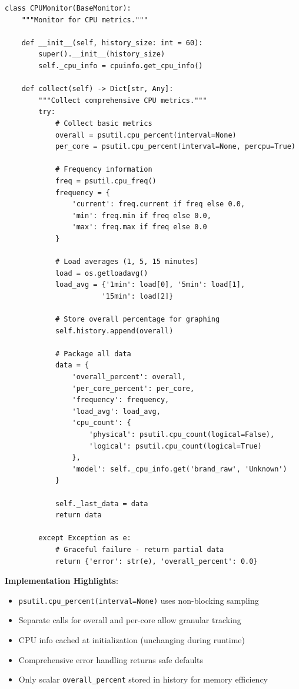 \documentclass[12pt,a4paper,oneside]{report}
\begin{document}
\begin{lstlisting}
class CPUMonitor(BaseMonitor):
    """Monitor for CPU metrics."""
    
    def __init__(self, history_size: int = 60):
        super().__init__(history_size)
        self._cpu_info = cpuinfo.get_cpu_info()
    
    def collect(self) -> Dict[str, Any]:
        """Collect comprehensive CPU metrics."""
        try:
            # Collect basic metrics
            overall = psutil.cpu_percent(interval=None)
            per_core = psutil.cpu_percent(interval=None, percpu=True)
            
            # Frequency information
            freq = psutil.cpu_freq()
            frequency = {
                'current': freq.current if freq else 0.0,
                'min': freq.min if freq else 0.0,
                'max': freq.max if freq else 0.0
            }
            
            # Load averages (1, 5, 15 minutes)
            load = os.getloadavg()
            load_avg = {'1min': load[0], '5min': load[1], 
                       '15min': load[2]}
            
            # Store overall percentage for graphing
            self.history.append(overall)
            
            # Package all data
            data = {
                'overall_percent': overall,
                'per_core_percent': per_core,
                'frequency': frequency,
                'load_avg': load_avg,
                'cpu_count': {
                    'physical': psutil.cpu_count(logical=False),
                    'logical': psutil.cpu_count(logical=True)
                },
                'model': self._cpu_info.get('brand_raw', 'Unknown')
            }
            
            self._last_data = data
            return data
            
        except Exception as e:
            # Graceful failure - return partial data
            return {'error': str(e), 'overall_percent': 0.0}
\end{lstlisting}

\textbf{Implementation Highlights}:
\begin{itemize}
    \item \texttt{psutil.cpu\_percent(interval=None)} uses non-blocking sampling
    \item Separate calls for overall and per-core allow granular tracking
    \item CPU info cached at initialization (unchanging during runtime)
    \item Comprehensive error handling returns safe defaults
    \item Only scalar \texttt{overall\_percent} stored in history for memory efficiency
\end{itemize}
\end{document}
